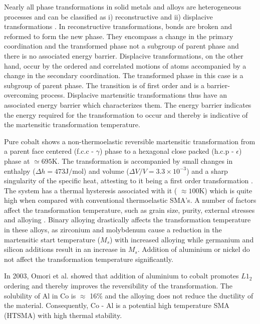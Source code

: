 \documentclass[preprint]{elsarticle}
\begin{document}
Nearly all phase transformations in solid metals and alloys are heterogeneous processes and can be classified as i) reconstructive and ii) displacive transformations \cite{christian2002theory}. In reconstructive transformations, bonds are broken and reformed to form the new phase. They encompass a change in the primary coordination and the transformed phase not a subgroup of parent phase and there is no associated energy barrier. Displacive transformations, on the other hand, occur by the ordered and correlated motions of atoms accompanied by a change in the  secondary
coordination. The transformed phase in this case is a subgroup of parent phase. The transition is of first order and is a barrier-overcoming process. Displacive martensitic transformations thus have an associated energy barrier which characterizes them. The energy barrier indicates the energy required for the transformation to occur and thereby is indicative of the martensitic transformation temperature. 

Pure cobalt shows a non-thermoelastic reversible martensitic transformation from a parent face centered (f.c.c - $\gamma$) phase to a hexagonal close packed 
(h.c.p - $\epsilon$) phase at $\simeq 695 \si{\kelvin} $\cite{koval2000high}. The transformation is accompanied by small changes in enthalpy
 ($\Delta h= 473 \si{\joule\per\mole}$) and volume ($\Delta V/V=3.3\times 10^{-3} $) and a sharp singularity of the specific heat,  attesting to it being a 
first order transformation \cite{toledano2001theory}. The system has a thermal hysteresis associated with it 
( $\approx 100 \si{\kelvin}$) which is quite high when compared with conventional thermoelastic SMA's. A number of factors affect the transformation temperature, 
such as grain size, purity, external stresses and alloying \cite{koval2000high}. Binary alloying drastically affects the transformation temperature in these alloys, as zirconium and 
molybdenum cause a reduction in the martensitic start temperature ($M_s$) with increased alloying while germanium and silicon additions result in an increase 
in $M_s$. Addition of aluminium or nickel do not affect the transformation temperature significantly\cite{koval2000high,omori2003}.

In 2003, Omori et al.\cite{omori2003} showed that addition of aluminium to cobalt promotes $L1_{2}$ ordering and thereby improves the reversibility of the 
transformation. The solubility of Al in Co is $\approx$ 16\% and the alloying does not reduce the ductility of the material. Consequently, Co - Al is a potential high temperature SMA (HTSMA) with high thermal stability. 
\end{document}
